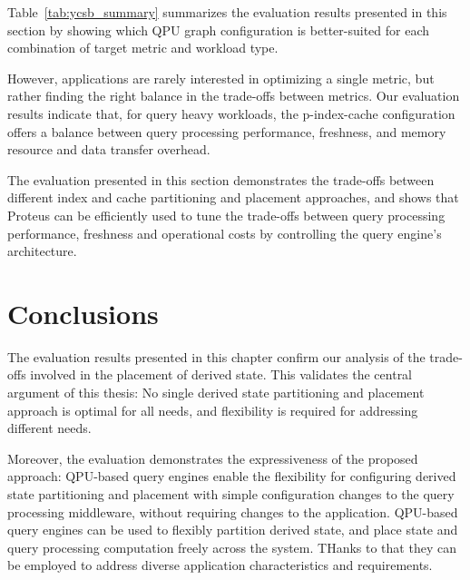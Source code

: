 Table~\ref{tab:ycsb_summary} summarizes the evaluation results presented in this section
by showing which QPU graph configuration is better-suited for each combination of target metric
and workload type.

However, applications are rarely interested in optimizing a single metric,
but rather finding the right balance in the trade-offs between metrics.
Our evaluation results indicate that, for query heavy workloads,
the p-index-cache configuration offers a balance between query processing performance,
freshness, and memory resource and data transfer overhead.

The evaluation presented in this section demonstrates the trade-offs between
different index and cache partitioning and placement approaches,
and shows that Proteus can be efficiently used to tune the trade-offs between query processing
performance, freshness and operational costs by controlling the query engine's architecture.

\section{Conclusions}

The evaluation results presented in this chapter confirm our analysis of the trade-offs
involved in the placement of derived state.
This validates the central argument of this thesis:
No single derived state partitioning and placement approach is optimal for all needs,
and flexibility is required for addressing different needs.

Moreover, the evaluation demonstrates the expressiveness of the proposed approach:
QPU-based query engines enable the flexibility for configuring derived state partitioning and placement
with simple configuration changes to the query processing middleware, without requiring changes to the application.
QPU-based query engines can be used to flexibly partition derived state, and place state and query processing computation
freely across the system.
THanks to that they can be employed to address diverse application characteristics and requirements.
